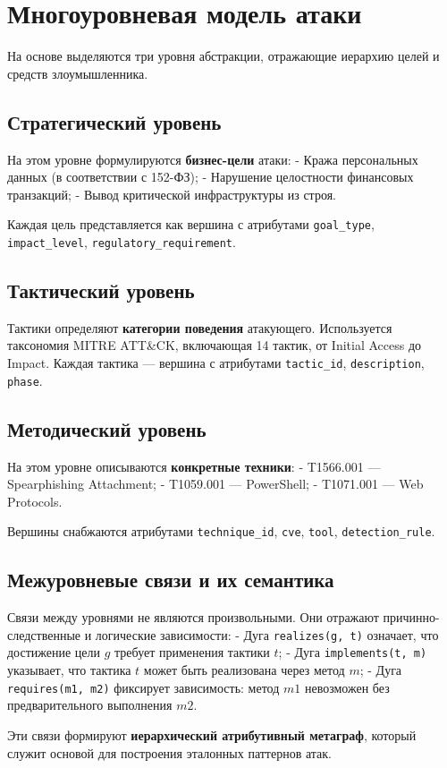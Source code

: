 \section{Многоуровневая модель атаки}

На основе \cite{latypov2020multilevel} выделяются три уровня абстракции, отражающие иерархию целей и средств злоумышленника.

\subsection{Стратегический уровень}

На этом уровне формулируются \textbf{бизнес-цели} атаки:
- Кража персональных данных (в соответствии с 152-ФЗ);
- Нарушение целостности финансовых транзакций;
- Вывод критической инфраструктуры из строя.

Каждая цель представляется как вершина с атрибутами \texttt{goal\_type}, \texttt{impact\_level}, \texttt{regulatory\_requirement}.

\subsection{Тактический уровень}

Тактики определяют \textbf{категории поведения} атакующего. Используется таксономия MITRE ATT\&CK, включающая 14 тактик, от Initial Access до Impact. Каждая тактика — вершина с атрибутами \texttt{tactic\_id}, \texttt{description}, \texttt{phase}.

\subsection{Методический уровень}

На этом уровне описываются \textbf{конкретные техники}:
- T1566.001 — Spearphishing Attachment;
- T1059.001 — PowerShell;
- T1071.001 — Web Protocols.

Вершины снабжаются атрибутами \texttt{technique\_id}, \texttt{cve}, \texttt{tool}, \texttt{detection\_rule}.

\subsection{Межуровневые связи и их семантика}

Связи между уровнями не являются произвольными. Они отражают причинно-следственные и логические зависимости:
- Дуга \texttt{realizes(g, t)} означает, что достижение цели \(g\) требует применения тактики \(t\);
- Дуга \texttt{implements(t, m)} указывает, что тактика \(t\) может быть реализована через метод \(m\);
- Дуга \texttt{requires(m1, m2)} фиксирует зависимость: метод \(m1\) невозможен без предварительного выполнения \(m2\).

Эти связи формируют \textbf{иерархический атрибутивный метаграф}, который служит основой для построения эталонных паттернов атак.
